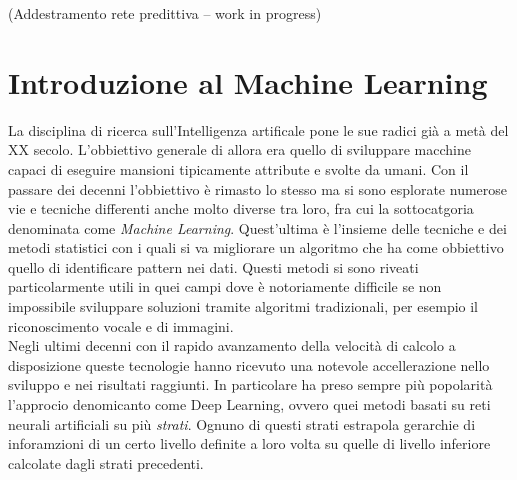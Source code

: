 \documentclass[12pt,a4paper,openright,twoside]{report}
\begin{document}
(Addestramento rete predittiva -- work in progress)
\clearpage{\pagestyle{empty}\cleardoublepage}
\rhead[\fancyplain{}{\bfseries\leftmark}]{\fancyplain{}{\bfseries\thepage}}


\chapter{Introduzione al Machine Learning}                %
\lhead[\fancyplain{}{\bfseries\thepage}]{\fancyplain{}{\bfseries\rightmark}}
La disciplina di ricerca sull'Intelligenza artificale pone le sue radici già a metà del XX secolo. L'obbiettivo generale di allora era quello di sviluppare macchine capaci di eseguire mansioni tipicamente attribute e svolte da umani. 
Con il passare dei decenni l'obbiettivo è rimasto lo stesso ma si sono esplorate numerose vie e tecniche differenti anche molto diverse tra loro, fra cui la sottocatgoria denominata come \emph{Machine Learning}. Quest'ultima è l'insieme delle tecniche e dei metodi statistici con i quali si va migliorare un algoritmo che ha come obbiettivo quello di identificare pattern nei dati. 
Questi metodi si sono riveati particolarmente utili in quei campi dove è notoriamente difficile se non impossibile sviluppare soluzioni tramite algoritmi tradizionali, per esempio il riconoscimento vocale e di immagini.\\
Negli ultimi decenni con il rapido avanzamento della velocità di calcolo a disposizione queste tecnologie hanno ricevuto una notevole accellerazione nello sviluppo e nei risultati raggiunti. 
In particolare ha preso sempre più popolarità l'approcio denomicanto come Deep Learning, ovvero quei metodi basati su reti neurali artificiali su più \emph{strati}. Ognuno di questi strati estrapola gerarchie di inforamzioni di un certo livello definite a loro volta su quelle di livello inferiore calcolate dagli strati precedenti.
\end{document}
